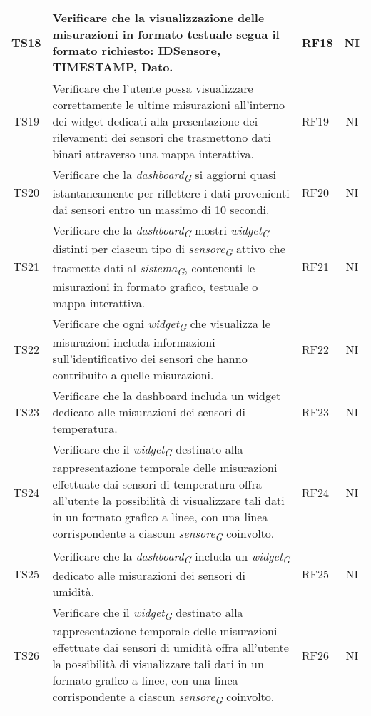 \begin{longtable}{|c|p{5cm}|>{\raggedright}p{2cm}|c|}
        \hline
        TS18 & Verificare che la visualizzazione delle misurazioni in formato testuale segua il formato richiesto: IDSensore, TIMESTAMP, Dato. & RF18 & NI \\
        \hline
        TS19 & Verificare che l'utente possa visualizzare correttamente le ultime misurazioni all'interno dei widget dedicati alla presentazione dei rilevamenti dei sensori che trasmettono dati binari attraverso una mappa interattiva. & RF19 & NI \\
        \hline
        TS20 & Verificare che la \textit{dashboard}\textsubscript{\textit{G}} si aggiorni quasi istantaneamente per riflettere i dati provenienti dai sensori entro un massimo di 10 secondi. & RF20 & NI \\
        \hline
        TS21 & Verificare che la \textit{dashboard}\textsubscript{\textit{G}} mostri \textit{widget}\textsubscript{\textit{G}} distinti per ciascun tipo di \textit{sensore}\textsubscript{\textit{G}} attivo che trasmette dati al \textit{sistema}\textsubscript{\textit{G}}, contenenti le misurazioni in formato grafico, testuale o mappa interattiva. & RF21 & NI \\
        \hline
        TS22 & Verificare che ogni \textit{widget}\textsubscript{\textit{G}} che visualizza le misurazioni includa informazioni sull'identificativo dei sensori che hanno contribuito a quelle misurazioni. & RF22 & NI \\
        \hline
        TS23 & Verificare che la dashboard includa un widget dedicato alle misurazioni dei sensori di temperatura. & RF23 & NI \\
        \hline
        TS24 & Verificare che il \textit{widget}\textsubscript{\textit{G}} destinato alla rappresentazione temporale delle misurazioni effettuate dai sensori di temperatura offra all'utente la possibilità di visualizzare tali dati in un formato grafico a linee, con una linea corrispondente a ciascun \textit{sensore}\textsubscript{\textit{G}} coinvolto. & RF24 & NI \\
        \hline
        TS25 & Verificare che la \textit{dashboard}\textsubscript{\textit{G}} includa un \textit{widget}\textsubscript{\textit{G}} dedicato alle misurazioni dei sensori di umidità. & RF25 & NI \\
        \hline
        TS26 & Verificare che il \textit{widget}\textsubscript{\textit{G}} destinato alla rappresentazione temporale delle misurazioni effettuate dai sensori di umidità offra all'utente la possibilità di visualizzare tali dati in un formato grafico a linee, con una linea corrispondente a ciascun \textit{sensore}\textsubscript{\textit{G}} coinvolto. & RF26 & NI \\

\end{longtable}
